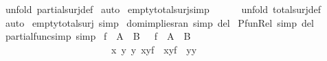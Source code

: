 \begin{isabellebody}
%
\isadelimproof
%
\endisadelimproof
%
\isatagproof
{}\isamarkupfalse%
\ {\isacharparenleft}unfold\ partial{\isacharunderscore}surj{\isacharunderscore}def{\isacharparenright}\isanewline
{}\isamarkupfalse%
\ auto\isanewline
{}\isamarkupfalse%
%
\endisatagproof
{\isafoldproof}%
%
\isadelimproof
%
\endisadelimproof
%
\isamarkuptrue%
\isamarkupfalse%
\ empty{\isacharunderscore}total{\isacharunderscore}surj{\isacharbrackleft}simp{\isacharbrackright}{\isacharcolon}\ {\isachardoublequoteopen}{\isacharbraceleft}{\isacharbraceright}\ {\isacharcolon}\ {\isacharparenleft}{\isacharbraceleft}{\isacharbraceright}\ {\isacharminus}{\isacharminus}{\isachargreater}{\isachargreater}\ {\isacharbraceleft}{\isacharbraceright}{\isacharparenright}{\isachardoublequoteclose}\isanewline
%
\isadelimproof
%
\endisadelimproof
%
\isatagproof
{}\isamarkupfalse%
\ {\isacharparenleft}unfold\ total{\isacharunderscore}surj{\isacharunderscore}def{\isacharparenright}\isanewline
{}\isamarkupfalse%
\ auto\isanewline
{}\isamarkupfalse%
%
\endisatagproof
{\isafoldproof}%
%
\isadelimproof
\isanewline
%
\endisadelimproof
{}\isamarkupfalse%
\ empty{\isacharunderscore}total{\isacharunderscore}surj\ {\isacharbrackleft}simp{\isacharbrackright}\isanewline
\isanewline
{}\isamarkupfalse%
\ dom{\isacharunderscore}implies{\isacharunderscore}ran\ {\isacharbrackleft}simp\ del{\isacharbrackright}%
\isamarkuptrue%
\isamarkupfalse%
\ Pfun{\isacharunderscore}Rel\ {\isacharbrackleft}simp\ del{\isacharbrackright}\isanewline
\isanewline
{}\isamarkupfalse%
\ partial{\isacharunderscore}func{\isacharunderscore}simp\ {\isacharbrackleft}simp{\isacharbrackright}{\isacharcolon}\ \isanewline
{\isachardoublequoteopen}{\isacharparenleft}f\ {\isacharcolon}\ {\isacharparenleft}A\ {\isacharminus}{\isacharbar}{\isacharminus}{\isachargreater}\ B{\isacharparenright}{\isacharparenright}\ {\isacharequal}\ \ {\isacharparenleft}f\ {\isacharcolon}\ {\isacharparenleft}A\ {\isacharless}{\isacharminus}{\isacharminus}{\isachargreater}\ B{\isacharparenright}\ {\isacharampersand}\ \isanewline
\ \ \ \ \ \ \ \ \ \ \ \ \ \ \ \ \ \ \ \ \ \ {\isacharparenleft}{\isacharbang}\ x\ y{}\ y{}{\isachardot}\ {\isacharparenleft}x{\isacharcomma}y{}{\isacharparenright}{\isacharcolon}f\ {\isacharampersand}\ {\isacharparenleft}x{\isacharcomma}y{}{\isacharparenright}{\isacharcolon}f\ {\isacharminus}{\isacharminus}{\isachargreater}\ y{}{\isacharequal}y{}{\isacharparenright}{\isacharparenright}{\isachardoublequoteclose}\isanewline

\end{isabellebody}
